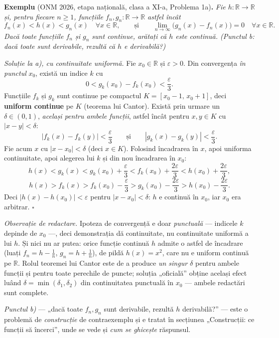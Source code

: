 \textbf{Exemplu} (ONM 2026, etapa națională, clasa a XI-a, Problema 1a)\textbf{.} \emph{Fie $h:\mathbb{R}\to\mathbb{R}$ și, pentru fiecare $n\ge1$, funcțiile $f_n,g_n:\mathbb{R}\to\mathbb{R}$ astfel încât}
\[
f_n(x)<h(x)<g_n(x)\quad\forall x\in\mathbb{R},
\qquad\text{și}\qquad
\lim_{n\to\infty}\big(g_n(x)-f_n(x)\big)=0\quad\forall x\in\mathbb{R}.
\]
\emph{Dacă toate funcțiile $f_n$ și $g_n$ sunt continue, arătați că $h$ este continuă. (Punctul b: dacă toate sunt derivabile, rezultă că $h$ e derivabilă?)}

\smallskip
\emph{Soluție la a), cu continuitate uniformă.} Fie $x_0\in\mathbb{R}$ și $\varepsilon>0$. Din convergența \emph{în punctul} $x_0$, există un indice $k$ cu
\[
0<g_k(x_0)-f_k(x_0)<\frac\varepsilon3.
\]
Funcțiile $f_k$ și $g_k$ sunt continue pe compactul $K=[x_0-1,\,x_0+1]$, deci \textbf{uniform continue} pe $K$ (teorema lui Cantor). Există prin urmare un $\delta\in(0,1)$, \emph{același pentru ambele funcții}, astfel încât pentru $x,y\in K$ cu $|x-y|<\delta$:
\[
|f_k(x)-f_k(y)|<\frac\varepsilon3
\qquad\text{și}\qquad
|g_k(x)-g_k(y)|<\frac\varepsilon3.
\]
Fie acum $x$ cu $|x-x_0|<\delta$ (deci $x\in K$). Folosind încadrarea în $x$, apoi uniforma continuitate, apoi alegerea lui $k$ și din nou încadrarea în $x_0$:
\[
h(x)<g_k(x)<g_k(x_0)+\frac\varepsilon3<f_k(x_0)+\frac{2\varepsilon}3<h(x_0)+\frac{2\varepsilon}3,
\]
\[
h(x)>f_k(x)>f_k(x_0)-\frac\varepsilon3>g_k(x_0)-\frac{2\varepsilon}3>h(x_0)-\frac{2\varepsilon}3.
\]
Deci $|h(x)-h(x_0)|<\varepsilon$ pentru $|x-x_0|<\delta$: $h$ e continuă în $x_0$, iar $x_0$ era arbitrar. $\square$

\emph{Observație de redactare.} Ipoteza de convergență e doar \emph{punctuală} --- indicele $k$ depinde de $x_0$ ---, deci demonstrația dă continuitate, nu continuitate uniformă a lui $h$. Și nici nu ar putea: orice funcție continuă $h$ admite o astfel de încadrare (luați $f_n=h-\frac1n$, $g_n=h+\frac1n$), de pildă $h(x)=x^2$, care nu e uniform continuă pe $\mathbb{R}$. Rolul teoremei lui Cantor este de a produce \emph{un singur $\delta$} pentru ambele funcții și pentru toate perechile de puncte; soluția „oficială'' obține același efect luând $\delta=\min(\delta_1,\delta_2)$ din continuitatea punctuală în $x_0$ --- ambele redactări sunt complete.

\smallskip
\emph{Punctul b)} --- „dacă toate $f_n,g_n$ sunt derivabile, rezultă $h$ derivabilă?'' --- este o problemă de \emph{construcție} de contraexemplu și e tratat în secțiunea „Construcții: ce funcții să încerci'', unde se vede și \emph{cum se ghicește} răspunsul.

